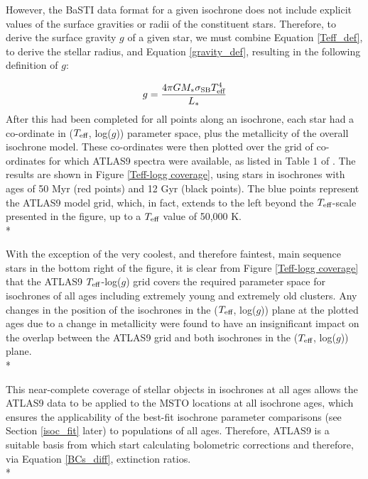\documentclass[12pt, a4paper]{report}
\begin{document}
However, the BaSTI data format for a given isochrone does not include explicit values of the surface gravities or radii of the constituent stars. Therefore, to derive the surface gravity $g$ of a given star, we must combine Equation \ref{Teff_def}, to derive the stellar radius, and Equation \ref{gravity_def}, resulting in the following definition of $g$:

\begin{equation}
\label{gravity_LT_calc}
g = \frac{4 \pi G M_{*} \sigma_{\textnormal{SB}} T_{\textnormal{eff}}^{4}}{L_{*}}
\end{equation}
After this had been completed for all points along an isochrone, each star had a co-ordinate in ($T_{\textnormal{eff}}$, log($g$)) parameter space, plus the metallicity of the overall isochrone model. These co-ordinates were then plotted over the grid of co-ordinates for which ATLAS9 spectra were available, as listed in Table 1 of \cite{2004astro.ph..5087C}. The results are shown in Figure \ref{Teff-logg coverage}, using stars in isochrones with ages of 50 Myr (red points) and 12 Gyr (black points). The blue points represent the ATLAS9 model grid, which, in fact, extends to the left beyond the $T_{\textnormal{eff}}$-scale presented in the figure, up to a $T_{\textnormal{eff}}$ value of 50,000 K.\\*

With the exception of the very coolest, and therefore faintest, main sequence stars in the bottom right of the figure, it is clear from Figure \ref{Teff-logg coverage} that the ATLAS9 $T_{\textnormal{eff}}$-log($g$) grid covers the required parameter space for isochrones of all ages including extremely young and extremely old clusters. Any changes in the position of the isochrones in the ($T_{\textnormal{eff}}$, log($g$)) plane at the plotted ages due to a change in metallicity were found to have an insignificant impact on the overlap between the ATLAS9 grid and both isochrones in the ($T_{\textnormal{eff}}$, log($g$)) plane. \\*

This near-complete coverage of stellar objects in isochrones at all ages allows the ATLAS9 data to be applied to the MSTO locations at all isochrone ages, which ensures the applicability of the best-fit isochrone parameter comparisons (see Section \ref{isoc_fit} later) to populations of all ages. Therefore, ATLAS9 is a suitable basis from which start calculating bolometric corrections and therefore, via Equation \ref{BCs_diff}, extinction ratios. \\*
\end{document}
